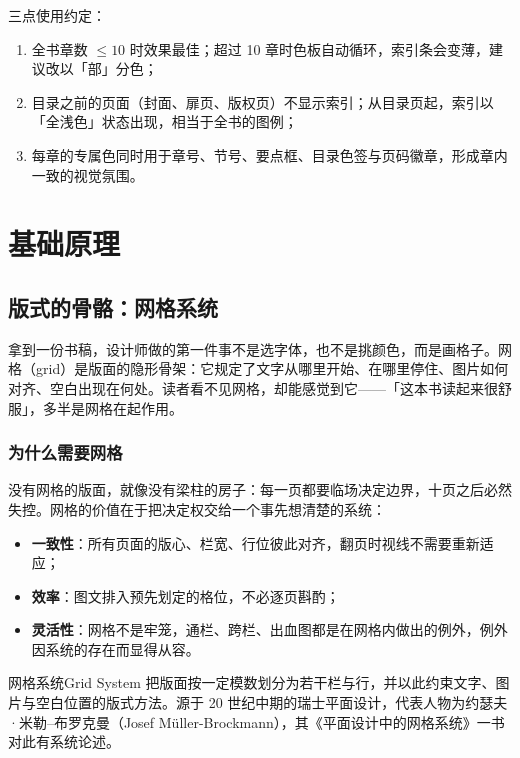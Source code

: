 \documentclass{bookedge}
\begin{document}
\bigskip
\noindent 三点使用约定：

\begin{enumerate}
  \item 全书章数 $\le 10$ 时效果最佳；超过 10 章时色板自动循环，索引条会变薄，建议改以「部」分色；
  \item 目录之前的页面（封面、扉页、版权页）不显示索引；从目录页起，索引以「全浅色」状态出现，相当于全书的图例；
  \item 每章的专属色同时用于章号、节号、要点框、目录色签与页码徽章，形成章内一致的视觉氛围。
\end{enumerate}

\bookedgetabson
\tableofcontents

\mainmatter

\part{基础原理}

\chapter{版式的骨骼：网格系统}

拿到一份书稿，设计师做的第一件事不是选字体，也不是挑颜色，而是画格子。网格（grid）是版面的隐形骨架：它规定了文字从哪里开始、在哪里停住、图片如何对齐、空白出现在何处。读者看不见网格，却能感觉到它——「这本书读起来很舒服」，多半是网格在起作用。

\section{为什么需要网格}

没有网格的版面，就像没有梁柱的房子：每一页都要临场决定边界，十页之后必然失控。网格的价值在于把决定权交给一个事先想清楚的系统：

\begin{itemize}
  \item \textbf{一致性}：所有页面的版心、栏宽、行位彼此对齐，翻页时视线不需要重新适应；
  \item \textbf{效率}：图文排入预先划定的格位，不必逐页斟酌；
  \item \textbf{灵活性}：网格不是牢笼，通栏、跨栏、出血图都是在网格内做出的例外，例外因系统的存在而显得从容。
\end{itemize}

\begin{entry}{网格系统}{Grid System}
把版面按一定模数划分为若干栏与行，并以此约束文字、图片与空白位置的版式方法。源于 20 世纪中期的瑞士平面设计，代表人物为约瑟夫·米勒–布罗克曼（Josef Müller-Brockmann），其《平面设计中的网格系统》一书对此有系统论述。
\end{entry}
\end{document}
